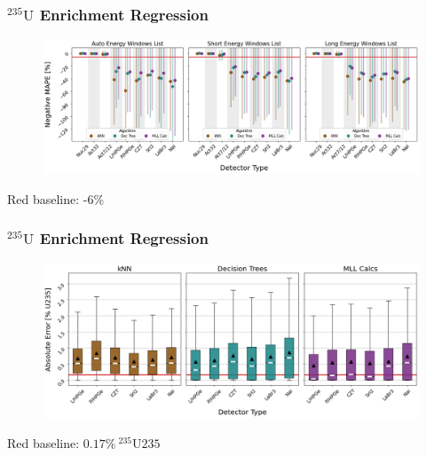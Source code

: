 \begin{frame}
  \frametitle{${}^{235}\text{U}$ Enrichment Regression}
  \begin{adjustwidth}{-15pt}{-10pt}
  \begin{figure}
    \centering
    \includegraphics[width=1.1\textwidth]{./figures/detector_preds_wrt_enlist_MAPE_enri.png}
  \end{figure}
  \vspace{12pt} \centering Red baseline: -6\% 
  \end{adjustwidth}
\end{frame}

\begin{frame}
  \frametitle{${}^{235}\text{U}$ Enrichment Regression}
  \begin{adjustwidth}{-15pt}{-10pt}
  \begin{figure}
    \centering
    \includegraphics[width=1.1\textwidth]{./figures/abserror_boxplots_auto_enri.png}
  \end{figure}
  \vspace{12pt} \centering Red baseline: $0.17\%\:{}^{235}\text{U235}$
  \end{adjustwidth}
\end{frame}

